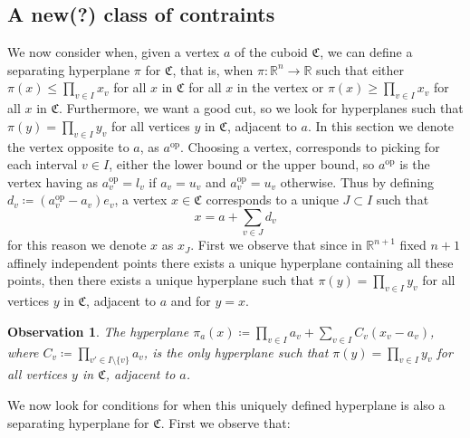 \documentclass{article}
\newtheorem{observation}[theorem]{Observation}
\begin{document}
\subsection{A new(?) class of contraints}
\newcommand{\aop}{a^{\text{op}}}
\newcommand{\prodset}{Pr}
\newcommand{\pisum}[1]{\prod_{v \in I\setminus{\{#1\}}}a_v (\aop_{#1}-a_{#1})}
We now consider when, given a vertex \(a\) of the cuboid \(\mathfrak{C}\), we can define a separating hyperplane \(\pi\) for \(\mathfrak{C}\), that is, when \(\pi: \mathbb{R}^n \to \mathbb{R}\)
such that either \(\pi(x) \leq \prod_{v \in I}x_v\) for all \(x\) in \(\mathfrak{C}\) for all \(x\) in the vertex or \(\pi(x) \geq \prod_{v \in I}x_v\)
for all \(x\) in \(\mathfrak{C}\). Furthermore, we want a good cut, so we look for hyperplanes such that \(\pi(y) = \prod_{v \in I}y_v\) for all vertices \(y\) in \(\mathfrak{C}\), adjacent to \(a\). 
%
In this section we denote the vertex opposite to \(a\), as \(\aop\). Choosing a vertex, corresponds to picking for each interval \(v \in I\), 
either the lower bound or the upper bound, so \(\aop\) is the vertex having as \(\aop_v = l_v\) if \(a_v = u_v\) and \(\aop_v = u_v\) otherwise.
%
Thus by defining \(d_v \coloneqq (\aop_v - a_v)e_v\), a vertex \(x \in \mathfrak{C}\) corresponds to a unique \(J \subset I\) such that \[x = a + \sum_{v \in J} d_v\]
for this reason we denote \(x\) as \(x_J\).
%
First we observe that since in \(\mathbb{R}^{n+1}\) fixed \(n+1\) affinely independent points there exists a unique hyperplane containing all these points, then there exists a unique hyperplane such that \(\pi(y) = \prod_{v \in I}y_v\) for all vertices \(y\) in \(\mathfrak{C}\), adjacent to \(a\) and for \(y = x\).
\begin{observation}
	The hyperplane \(\pi_a(x) \coloneqq \prod_{v \in I}a_v + \sum_{v \in I} C_v(x_v - a_v)\), 
	where \(C_v \coloneqq \prod_{v' \in I \setminus \{v\}}a_v\), is the only hyperplane such that \(\pi(y) = \prod_{v \in I}y_v\) for all vertices \(y\) in \(\mathfrak{C}\), adjacent to \(a\).
\end{observation}
%
We now look for conditions for when this uniquely defined hyperplane is also a separating hyperplane for \(\mathfrak{C}\). First we observe that: 
\end{document}
